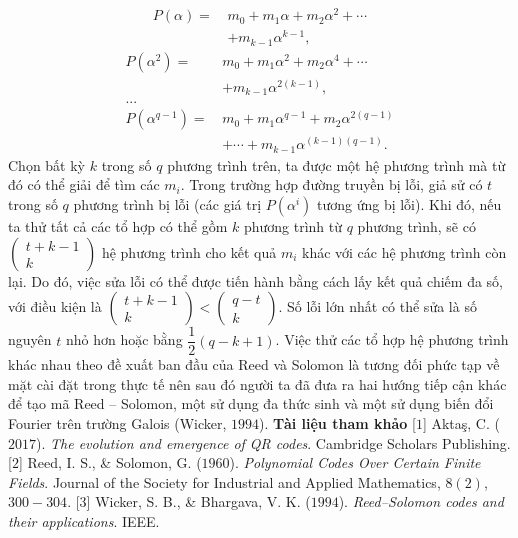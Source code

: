 \begin{multicols}{2}
\begin{align*}
		P(\alpha)=\,&m_0+m_1 \alpha+m_2 \alpha^2+\cdots\\[-0.5ex]
		&+m_{k-1} \alpha^{k-1},
		\end{align*}
		\begin{align*}
		P(\alpha^2 )=\,&m_0+m_1 \alpha^2+m_2 \alpha^4+\cdots\\[-0.5ex]
		&+m_{k-1} \alpha^{2(k-1)},\\[-0.5ex]
		...&\\[-0.5ex]
		P(\alpha^{q-1})=\,&m_0+m_1 \alpha^{q-1}+m_2 \alpha^{2(q-1)} \\[-0.5ex]
		&+\cdots+m_{k-1} \alpha^{(k-1)(q-1)}. 
	\end{align*}
	Chọn bất kỳ $k$ trong số $q$ phương trình trên, ta được một hệ phương trình mà từ đó có thể giải để tìm các $m_i$.
	\vskip 0.05cm
	Trong trường hợp đường truyền bị lỗi, giả sử có $t$ trong số $q$ phương trình bị lỗi (các giá trị $P\left(\alpha^i\right)$ tương ứng bị lỗi). Khi đó, nếu ta thử tất cả các tổ hợp có thể gồm $k$ phương trình từ $q$ phương trình, sẽ có $( \begin{array}{l}
		t + k - 1\\[-0.5ex]
		k
	\end{array})$ hệ phương trình cho kết quả $m_i$ khác với các hệ phương trình còn lại. Do đó, việc sửa lỗi có thể được tiến hành bằng cách lấy kết quả chiếm đa số, với điều kiện là  $( \begin{array}{l}
	t + k - 1\\[-0.5ex]
	k
\end{array}) <( \begin{array}{l}
q - t\\[-0.5ex]
k
\end{array})$. Số lỗi lớn nhất có thể sửa là số nguyên $t$ nhỏ hơn hoặc bằng $\dfrac{1}{2}(q-k+1)$.
\vskip 0.05cm
	Việc thử các tổ hợp hệ phương trình khác nhau theo đề xuất ban đầu của Reed và Solomon là tương đối phức tạp về mặt cài đặt trong thực tế nên sau đó người ta đã đưa ra hai hướng tiếp cận khác để tạo mã Reed -- Solomon, một sử dụng đa thức sinh và một sử dụng biến đổi Fourier trên trường Galois (Wicker, $1994$).
	\vskip 0.05cm
	\textbf{\color{toanhocdoisong}Tài liệu tham khảo}
	\vskip 0.05cm
	[$1$] Aktaş, C. ($2017$). \textit{The evolution and emergence of QR codes}. Cambridge Scholars Publishing.
	\vskip 0.05cm
	[$2$] Reed, I. S., \& Solomon, G. ($1960$). \textit{Polynomial Codes Over Certain Finite Fields}. Journal of the Society for Industrial and Applied Mathematics, $8(2)$, $300-304$. 
	\vskip 0.05cm
	[$3$] Wicker, S. B., \& Bhargava, V. K. ($1994$). \textit{Reed--Solomon codes and their applications}. IEEE.
\end{multicols}